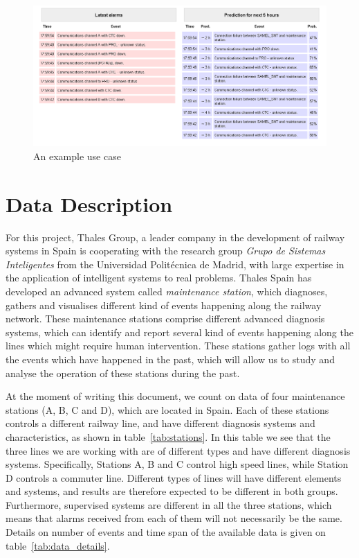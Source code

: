 \begin{figure}[hbtp]
\includegraphics[width=\textwidth]{img/demo_thales.png}
\caption{An example use case} \label{fig:demo_view}
\end{figure}

\section{Data Description}
For this project, Thales Group, a leader company in the development of railway systems in Spain is cooperating with the research group {\it Grupo de Sistemas Inteligentes} from the Universidad Politécnica de Madrid, with large expertise in the application of intelligent systems to real problems. Thales Spain has developed an advanced system called \emph{maintenance station}, which diagnoses, gathers and visualises different kind of events happening along the railway network. These maintenance stations comprise different advanced diagnosis systems, which can identify and report several kind of events happening along the lines which might require human intervention. These stations gather logs with all the events which have happened in the past, which will allow us to study and analyse the operation of these stations during the past.

At the moment of writing this document, we count on data of four maintenance stations (A, B, C and D), which are located in Spain. Each of these stations controls a different railway line, and have different diagnosis systems and characteristics, as shown in table~\ref{tab:stations}. In this table we see that the three lines we are working with are of different types and have different diagnosis systems. Specifically, Stations A, B and C control high speed lines, while Station D controls a commuter line. Different types of lines will have different elements and systems, and results are therefore expected to be different in both groups. Furthermore, supervised systems are different in all the three stations, which means that alarms received from each of them will not necessarily be the same. Details on number of events and time span of the available data is given on table~\ref{tab:data_details}.

